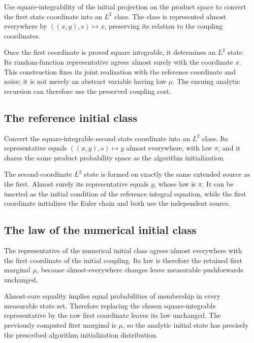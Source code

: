 \documentclass[11pt,a4paper]{article}
\begin{document}
Use square-integrability of the initial projection on the product space to convert the first state coordinate into an \(L^2\) class. The class is represented almost everywhere by \(((x,y),s)\mapsto x\), preserving its relation to the coupling coordinates.



Once the first coordinate is proved square integrable, it determines an \(L^2\) state. Its random-function representative agrees almost surely with the coordinate \(x\). This construction fixes its joint realization with the reference coordinate and noise; it is not merely an abstract variable having law \(\mu\). The ensuing analytic recursion can therefore use the preserved coupling cost.


\subsection{\texorpdfstring{The reference initial class}{The reference initial class}}


Convert the square-integrable second state coordinate into an \(L^2\) class. Its representative equals \(((x,y),s)\mapsto y\) almost everywhere, with law \(\pi\), and it shares the same product probability space as the algorithm initialization.



The second-coordinate \(L^2\) state is formed on exactly the same extended source as the first. Almost surely its representative equals \(y\), whose law is \(\pi\). It can be inserted as the initial condition of the reference integral equation, while the first coordinate initializes the Euler chain and both use the independent source.


\subsection{\texorpdfstring{The law of the numerical initial class}{The law of the numerical initial class}}


The representative of the numerical initial class agrees almost everywhere with the first coordinate of the initial coupling. Its law is therefore the retained first marginal \(\mu\), because almost-everywhere changes leave measurable pushforwards unchanged.



Almost-sure equality implies equal probabilities of membership in every measurable state set. Therefore replacing the chosen square-integrable representative by the raw first coordinate leaves its law unchanged. The previously computed first marginal is \(\mu\), so the analytic initial state has precisely the prescribed algorithm initialization distribution.
\end{document}
